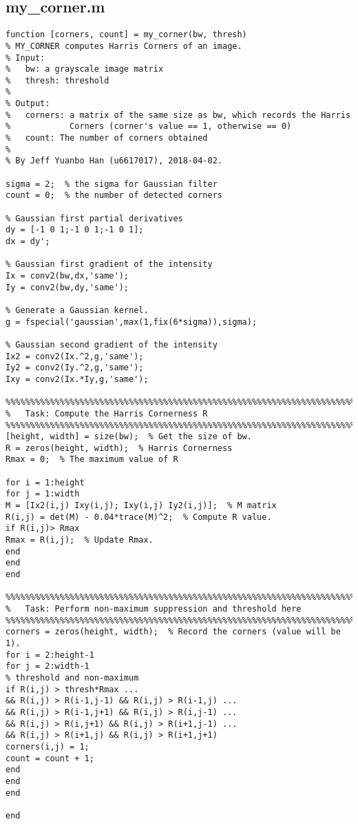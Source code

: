 \documentclass{article}
\begin{document}
\subsection{my\_corner.m}
\label{code-1}
\begin{lstlisting}
function [corners, count] = my_corner(bw, thresh)
% MY_CORNER computes Harris Corners of an image.
% Input:
%   bw: a grayscale image matrix
%   thresh: threshold
%
% Output:
%   corners: a matrix of the same size as bw, which records the Harris
%            Corners (corner's value == 1, otherwise == 0)
%   count: The number of corners obtained
% 
% By Jeff Yuanbo Han (u6617017), 2018-04-02.

sigma = 2;  % the sigma for Gaussian filter
count = 0;  % the number of detected corners

% Gaussian first partial derivatives
dy = [-1 0 1;-1 0 1;-1 0 1];
dx = dy';

% Gaussian first gradient of the intensity
Ix = conv2(bw,dx,'same');
Iy = conv2(bw,dy,'same');

% Generate a Gaussian kernel.
g = fspecial('gaussian',max(1,fix(6*sigma)),sigma);

% Gaussian second gradient of the intensity
Ix2 = conv2(Ix.^2,g,'same');
Iy2 = conv2(Iy.^2,g,'same');
Ixy = conv2(Ix.*Iy,g,'same');

%%%%%%%%%%%%%%%%%%%%%%%%%%%%%%%%%%%%%%%%%%%%%%%%%%%%%%%%%%%%%%%%%%%%%%%%%%%
%   Task: Compute the Harris Cornerness R
%%%%%%%%%%%%%%%%%%%%%%%%%%%%%%%%%%%%%%%%%%%%%%%%%%%%%%%%%%%%%%%%%%%%%%%%%%%
[height, width] = size(bw);  % Get the size of bw.
R = zeros(height, width);  % Harris Cornerness
Rmax = 0;  % The maximum value of R

for i = 1:height
for j = 1:width
M = [Ix2(i,j) Ixy(i,j); Ixy(i,j) Iy2(i,j)];  % M matrix
R(i,j) = det(M) - 0.04*trace(M)^2;  % Compute R value.
if R(i,j)> Rmax
Rmax = R(i,j);  % Update Rmax.
end
end
end

%%%%%%%%%%%%%%%%%%%%%%%%%%%%%%%%%%%%%%%%%%%%%%%%%%%%%%%%%%%%%%%%%%%%%%%%%%%
%   Task: Perform non-maximum suppression and threshold here
%%%%%%%%%%%%%%%%%%%%%%%%%%%%%%%%%%%%%%%%%%%%%%%%%%%%%%%%%%%%%%%%%%%%%%%%%%%
corners = zeros(height, width);  % Record the corners (value will be 1).
for i = 2:height-1
for j = 2:width-1
% threshold and non-maximum
if R(i,j) > thresh*Rmax ...
&& R(i,j) > R(i-1,j-1) && R(i,j) > R(i-1,j) ...
&& R(i,j) > R(i-1,j+1) && R(i,j) > R(i,j-1) ...
&& R(i,j) > R(i,j+1) && R(i,j) > R(i+1,j-1) ...
&& R(i,j) > R(i+1,j) && R(i,j) > R(i+1,j+1)
corners(i,j) = 1;
count = count + 1;
end
end
end

end

\end{lstlisting}
\end{document}
